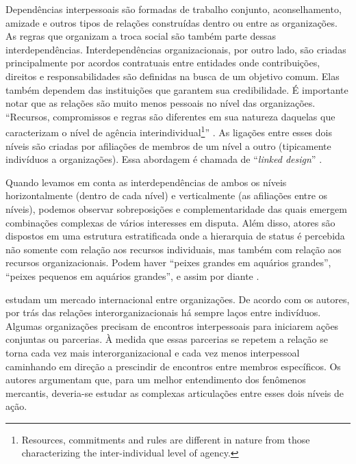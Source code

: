 \documentclass[a4paper, 12pt, openright, oneside, german, french, english, brazil]{abntex2}
\begin{document}
	Dependências interpessoais são formadas de trabalho conjunto, aconselhamento, amizade e outros tipos de relações construídas dentro ou entre as organizações. As regras que organizam a troca social são também parte dessas interdependências. Interdependências organizacionais, por outro lado, são criadas principalmente por acordos contratuais entre entidades onde contribuições, direitos e responsabilidades são definidas na busca de um objetivo comum. Elas também dependem das instituições que garantem sua credibilidade. É importante notar que as relações são muito menos pessoais no nível das organizações. ``Recursos, compromissos e regras são diferentes em sua natureza daquelas que caracterizam o nível de agência interindividual\footnote{Resources, commitments and rules are different in nature from those characterizing the inter-individual level of agency.}'' \cite[p. 49]{lazega2016synchronization}. As ligações entre esses dois níveis são criadas por afiliações de membros de um nível a outro (tipicamente indivíduos a organizações). Essa abordagem é chamada de ``\textit{linked design}'' \cite{lazega2008catching}.
	
	
	Quando levamos em conta as interdependências de ambos os níveis horizontalmente (dentro de cada nível) e verticalmente (as afiliações entre os níveis), podemos observar sobreposições e complementaridade das quais emergem combinações complexas de vários interesses em disputa. Além disso, atores são dispostos em uma estrutura estratificada onde a hierarquia de status é percebida não somente com relação aos recursos individuais, mas também com relação aos recursos organizacionais. Podem haver ``peixes grandes em aquários grandes'', ``peixes pequenos em aquários grandes'', e assim por diante \cite{lazega2008catching}.



	 estudam um mercado internacional entre organizações. De acordo com os autores, por trás das relações interorganizacionais há sempre laços entre indivíduos. Algumas organizações precisam de encontros interpessoais para iniciarem ações conjuntas ou parcerias. À medida que essas parcerias se repetem a relação se torna cada vez mais interorganizacional e cada vez menos interpessoal caminhando em direção a prescindir de encontros entre membros específicos. Os autores argumentam que, para um melhor entendimento dos fenômenos mercantis, deveria-se estudar as complexas articulações entre esses dois níveis de ação.
	
\end{document}
